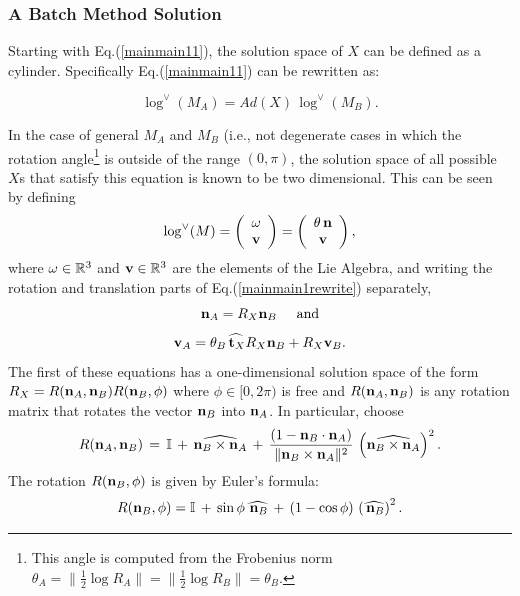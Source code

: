 \documentclass[twocolumn,10pt]{asme2ej}
\newcommand{\II}{\mathbb{I}}
\newcommand{\half}{\frac{1}{2}}
\begin{document}
\subsubsection{A Batch Method Solution}

Starting with Eq.(\ref{mainmain11}), the solution space of $X$ can be defined as a cylinder. Specifically Eq.(\ref{mainmain11}) can be rewritten as:

\begin{equation}
\log^{\vee}(M_A)  = Ad(X) \,\log^{\vee}(M_B).
\label{mainmain1rewrite} \end{equation}

In the case of general $M_A$ and $M_B$ (i.e., not degenerate cases in which the rotation angle\footnote{This angle is computed from the Frobenius norm $\theta_A =\|\half \log R_A\| = \|\half \log R_B\|= \theta_B$.} is outside of the range
$(0,\pi)$, the solution space of all possible $X$s that satisfy this equation is known to be two dimensional.
This can be seen by defining
$$ \log^{\vee}(M) = \left(\begin{array}{c}
\omega \\
{\bf v} \end{array} \right)
=\left(\begin{array}{c}
\theta \, {\bf n} \\
{\bf v} \end{array} \right), $$
where ${\bf \omega} \in \mathbb{R}^3$ and ${\bf v} \in \mathbb{R}^3$ are the elements of the Lie Algebra, and writing the rotation and translation parts of Eq.(\ref{mainmain1rewrite}) separately,
\begin{equation}
{\bf n}_A = R_X {\bf n}_B \hspace{5mm}\mbox{and}
\label{nanb} \end{equation}
\begin{equation}
{\bf v}_A = \theta_B \widehat{\,{\bf t}_X} R_X {\bf n}_B + R_X {\bf v}_B.
\label{vavb} \end{equation}
The first of these equations has a one-dimensional solution space of the form
$R_X = R({\bf n}_A, {\bf n}_B) R({\bf n}_B, \phi)$ where $\phi \in [0,2\pi)$ is free and
$R({\bf n}_A, {\bf n}_B)$ is any rotation matrix that rotates the vector ${\bf n}_B$ into ${\bf n}_A$.
In particular, choose
\begin{equation}
R({\bf n}_A, {\bf n}_B)  \,=\,
\II \,+\, \widehat{{\bf n}_B \times {\bf n}_A}
\,+\, \frac{(1- {\bf n}_B \cdot {\bf n}_A)}{\|{\bf n}_B \times {\bf n}_A\|^2} \, \left(\widehat{{\bf n}_B \times {\bf n}_A}\right)^2.
\label{transab}
\end{equation}
The rotation $R({\bf n}_B, \phi)$ is given by Euler's formula:
$$ R({\bf n}_B, \phi) = \II \,+\, \sin \phi \, \widehat{\,{\bf n}_B} \,+\, (1-\cos \phi)\, \left(\widehat{\,{\bf n}_B}\right)^2. $$
\end{document}
